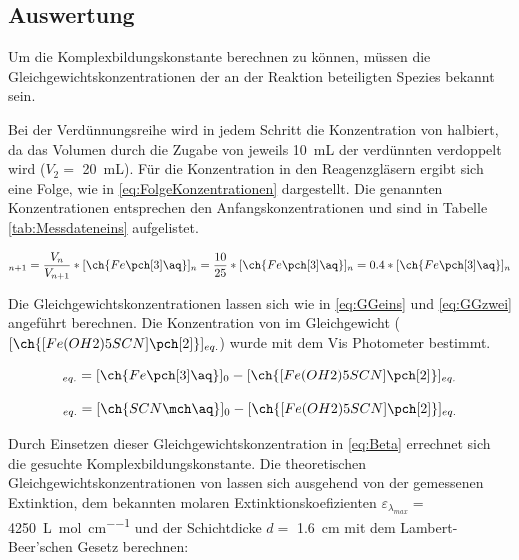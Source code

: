 \documentclass{article}
\begin{document}
    \pagebreak
    
    \subsection{Auswertung}
    
      Um die Komplexbildungskonstante berechnen zu können, müssen die Gleichgewichtskonzentrationen der an der Reaktion beteiligten Spezies bekannt sein. 
      
      Bei der Verdünnungsreihe wird in jedem Schritt die Konzentration von   halbiert, da das Volumen durch die Zugabe von jeweils \SI[mode=text]{10}{\milli\liter} der verdünnten  verdoppelt wird ($V_{2} =$ \SI[mode=text]{20}{\milli\liter}). Für die  Konzentration in den Reagenzgläsern ergibt sich eine Folge, wie in \eqref{eq:FolgeKonzentrationen} dargestellt. Die genannten Konzentrationen entsprechen den Anfangskonzentrationen und sind in Tabelle \ref{tab:Messdateneins} aufgelistet. 
    
      \begin{equation}
        [\ch{Fe\pch[3]\aq}]_{n+1} = \frac{V_{n}}{V_{n+1}} * [\ch{Fe\pch[3]\aq}]_{n} = \frac{10}{25} * [\ch{Fe\pch[3]\aq}]_{n} = 0.4 * [\ch{Fe\pch[3]\aq}]_{n}\label{eq:FolgeKonzentrationen}
      \end{equation}
    
      Die Gleichgewichtskonzentrationen lassen sich wie in \eqref{eq:GGeins} und \eqref{eq:GGzwei} angeführt berechnen. Die Konzentration von \ch{[Fe(OH2)5SCN]\pch[2]} im Gleichgewicht ($[\ch{[Fe(OH2)5SCN]\pch[2]}]_{eq.}$) wurde mit dem Vis Photometer bestimmt.
      
      \begin{equation}
        [\ch{Fe\pch[3]\aq}]_{eq.} = [\ch{Fe\pch[3]\aq}]_{0} - [\ch{[Fe(OH2)5SCN]\pch[2]}]_{eq.} \label{eq:GGeins}
      \end{equation}
      
      \begin{equation}
        [\ch{SCN\mch\aq}]_{eq.} = [\ch{SCN\mch\aq}]_{0} - [\ch{[Fe(OH2)5SCN]\pch[2]}]_{eq.} \label{eq:GGzwei}
      \end{equation}
      
      Durch Einsetzen dieser Gleichgewichtskonzentration in \eqref{eq:Beta} errechnet sich die gesuchte Komplexbildungskonstante. Die theoretischen Gleichgewichtskonzentrationen von \ch{[Fe(OH2)5SCN]\pch[2]} lassen sich ausgehend von der gemessenen Extinktion, dem bekannten molaren Extinktionskoefizienten $\varepsilon_{\lambda_{max}} =$ \SI[mode=text]{4250}{\liter\per\mole\per\centi\meter} und der Schichtdicke $d =$ \SI[mode=text]{1.6}{\centi\meter} mit dem Lambert-Beer'schen Gesetz berechnen:
      
\end{document}
